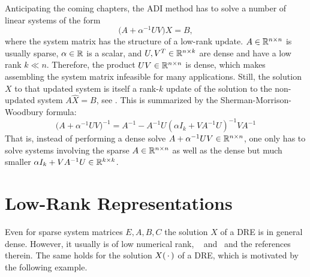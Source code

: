 Anticipating the coming chapters,
the \ac{ADI} method has to solve a number of linear systems of the form
\begin{equation}
  \big(A + \alpha^{-1} UV \big) X = B
  ,
\end{equation}
where the system matrix has the structure of a low-rank update.
$A\in\mathbb{R}^{n\times n}$ is usually sparse,
$\alpha\in\mathbb{R}$ is a scalar,
and $U, V^T \in\mathbb{R}^{n\times k}$ are dense and have a low rank $k\ll n$.
Therefore, the product $UV \in\mathbb{R}^{n\times n}$ is dense,
which makes assembling the system matrix infeasible for many applications.
Still, the solution $X$ to that updated system is itself a rank-$k$ update of the solution to the non-updated system $A \hat X = B$,
see \eg \cite{Strang2016, Golub2013}.
This is summarized by the Sherman-Morrison-Woodbury formula:
\begin{equation}
  \big( A + \alpha^{-1}UV \big)^{-1} =
  A^{-1} - A^{-1} U (\alpha I_k + V A^{-1} U)^{-1} V A^{-1}
\end{equation}
That is, instead of performing a dense solve \wrt $A + \alpha^{-1} UV \in\mathbb{R}^{n\times n}$,
one only has to solve systems involving the sparse $A \in \mathbb{R}^{n\times n}$
as well as the dense but much smaller $\alpha I_k + VA^{-1} U \in\mathbb{R}^{k\times k}$.

\section{Low-Rank Representations}
\label{sec:lowrank}

Even for sparse system matrices $E, A, B, C$
the solution $X$ of a \ac{DRE} is in general dense.
However, it usually is of low numerical rank,
\cf \eg~\cite[Section~2.1.4]{Lang2017}
and~\cite[Sections~2.3.3 and~2.3.4]{Kuerschner2016}
and the references therein.
The same holds for the solution $X(\optional{})$ of a \ac{DRE},
which is motivated by the following example.

